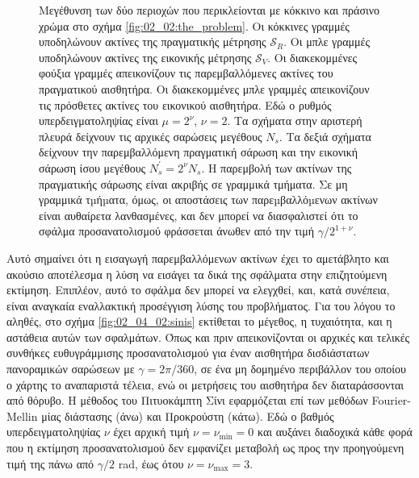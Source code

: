 \begin{figure}[!h]\centering
  \vspace{0.5cm}
  
  \vspace{1.0cm}
  \caption{\small Μεγέθυνση των δύο περιοχών που περικλείονται με κόκκινο
           και πράσινο χρώμα στο σχήμα \ref{fig:02_02:the_problem}. Οι κόκκινες
           γραμμές υποδηλώνουν ακτίνες της πραγματικής μέτρησης $\mathcal{S}_R$.
           Oι μπλε γραμμές υποδηλώνουν ακτίνες της εικονικής μέτρησης $\mathcal{S}_V$.
           Οι διακεκομμένες φούξια γραμμές απεικονίζουν τις παρεμβαλλόμενες
           ακτίνες του πραγματικού αισθητήρα. Οι διακεκομμένες μπλε γραμμές
           απεικονίζουν τις πρόσθετες ακτίνες του εικονικού αισθητήρα.
           Εδώ ο ρυθμός υπερδειγματοληψίας είναι $\mu = 2^\nu$, $\nu = 2$.
           Τα σχήματα στην αριστερή πλευρά δείχνουν τις αρχικές σαρώσεις
           μεγέθους $N_s$. Τα δεξιά σχήματα δείχνουν την παρεμβαλλόμενη
           πραγματική σάρωση και την εικονική σάρωση ίσου μεγέθους $N_s^\prime
           = 2^\nu N_s$. Η παρεμβολή των ακτίνων της πραγματικής σάρωσης είναι
           ακριβής σε γραμμικά τμήματα. Σε μη γραμμικά τµήµατα, όμως, οι
           αποστάσεις των παρεµβαλλόµενων ακτίνων είναι αυθαίρετα λανθασμένες,
           και δεν μπορεί να διασφαλιστεί ότι το σφάλμα προσανατολισμού
           φράσσεται άνωθεν από την τιμή $\gamma/2^{1+\nu}$. }
  \label{fig:oversampling_goes_wrong}
\end{figure}

Αυτό σημαίνει ότι η εισαγωγή παρεμβαλλόμενων ακτίνων έχει το αμετάβλητο και
ακούσιο αποτέλεσμα η λύση να εισάγει τα δικά της σφάλματα στην επιζητούμενη
εκτίμηση. Επιπλέον, αυτό το σφάλμα δεν μπορεί να ελεγχθεί, και, κατά συνέπεια,
είναι αναγκαία εναλλακτική προσέγγιση λύσης του προβλήματος. Για του λόγου το
αληθές, στο σχήμα \ref{fig:02_04_02:sinis} εκτίθεται το μέγεθος, η τυχαιότητα,
και η αστάθεια αυτών των σφαλμάτων. Όπως και πριν απεικονίζονται οι αρχικές και
τελικές συνθήκες ευθυγράμμισης προσανατολισμού για έναν αισθητήρα δισδιάστατων
πανοραμικών σαρώσεων με $\gamma = 2\pi/360$, σε ένα μη δομημένο περιβάλλον του
οποίου ο χάρτης το αναπαριστά τέλεια, ενώ οι μετρήσεις του αισθητήρα δεν
διαταράσσονται από θόρυβο. H μέθοδος του Πιτυοκάμπτη Σίνι εφαρμόζεται επί των
μεθόδων Fourier-Mellin μίας διάστασης (άνω) και Προκρούστη (κάτω). Εδώ ο βαθμός
υπερδειγματοληψίας $\nu$ έχει αρχική τιμή $\nu = \nu_{\min} = 0$ και αυξάνει
διαδοχικά κάθε φορά που η εκτίμηση προσανατολισμού δεν εμφανίζει μεταβολή ως
προς την προηγούμενη τιμή της πάνω από $\gamma/2$ rad, έως ότου $\nu =
\nu_{\max} = 3$.

